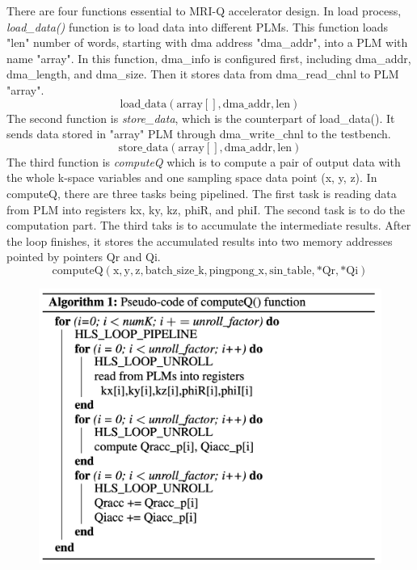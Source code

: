 There are four functions essential to MRI-Q accelerator design. In load process,
\textit{load\_data()} function is to load data into different PLMs. This
function loads "len" number of words, starting with dma address "dma\_addr",
into a PLM with name "array". In this function, dma\_info is configured first,
including dma\_addr, dma\_length, and dma\_size. Then it stores data from
dma\_read\_chnl to PLM "array".
%
$$\mathrm{load\_data(array[], dma\_addr, len)}$$
%
The second function is \textit{store\_data}, which is the counterpart of
load\_data(). It sends data stored in "array" PLM through dma\_write\_chnl to
the testbench.
%
$$\mathrm{store\_data(array[], dma\_addr, len)}$$
%
The third function is \textit{computeQ} which is to compute a pair of output
data with the whole k-space variables and one sampling space data point (x, y,
z). In computeQ, there are three tasks being pipelined. The first task is
reading data from PLM into registers kx, ky, kz, phiR, and phiI. The second task
is to do the computation part. The third taks is to accumulate the intermediate
results. After the loop finishes, it stores the accumulated results into two
memory addresses pointed by pointers Qr and Qi.
%
$$\mathrm{computeQ(x, y, z, batch\_size\_k, pingpong\_x, sin\_table, *Qr, *Qi)}$$

\begin{figure}[t]
\centering
\captionsetup{justification=centering, format=hang}
\includegraphics[width=\columnwidth]{figures/computeQAlgorithm.png}
\label{fig-data-convert}
\end{figure}

